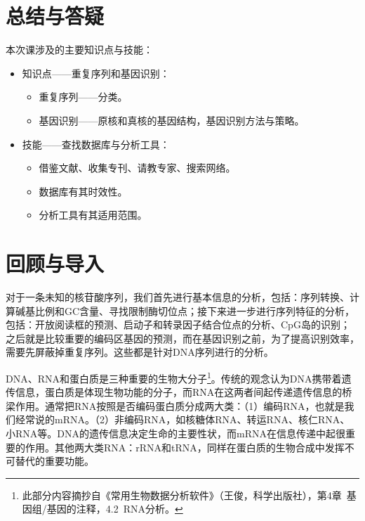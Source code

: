 \documentclass[11pt,a4paper,twoside]{book}
\begin{document}
\section{总结与答疑}
本次课涉及的主要知识点与技能：
\begin{itemize}
  \item 知识点——重复序列和基因识别：
    \begin{itemize}
      \item 重复序列——分类。
      \item 基因识别——原核和真核的基因结构，基因识别方法与策略。
    \end{itemize}
  \item 技能——查找数据库与分析工具：
    \begin{itemize}
      \item 借鉴文献、收集专刊、请教专家、搜索网络。
      \item 数据库有其时效性。
      \item 分析工具有其适用范围。
    \end{itemize}
\end{itemize}

\section{回顾与导入}
对于一条未知的核苷酸序列，我们首先进行基本信息的分析，包括：序列转换、计算碱基比例和GC含量、寻找限制酶切位点；接下来进一步进行序列特征的分析，包括：开放阅读框的预测、启动子和转录因子结合位点的分析、CpG岛的识别；之后就是比较重要的编码区基因的预测，而在基因识别之前，为了提高识别效率，需要先屏蔽掉重复序列。这些都是针对DNA序列进行的分析。

DNA、RNA和蛋白质是三种重要的生物大分子\footnote{此部分内容摘抄自《常用生物数据分析软件》（王俊，科学出版社），第4章\ 基因组/基因的注释，4.2\ RNA分析。}。传统的观念认为DNA携带着遗传信息，蛋白质是体现生物功能的分子，而RNA在这两者间起传递遗传信息的桥梁作用。通常把RNA按照是否编码蛋白质分成两大类：（1）编码RNA，也就是我们经常说的mRNA。（2）非编码RNA，如核糖体RNA、转运RNA、核仁RNA、小RNA等。DNA的遗传信息决定生命的主要性状，而mRNA在信息传递中起很重要的作用。其他两大类RNA：rRNA和tRNA，同样在蛋白质的生物合成中发挥不可替代的重要功能。
\end{document}
